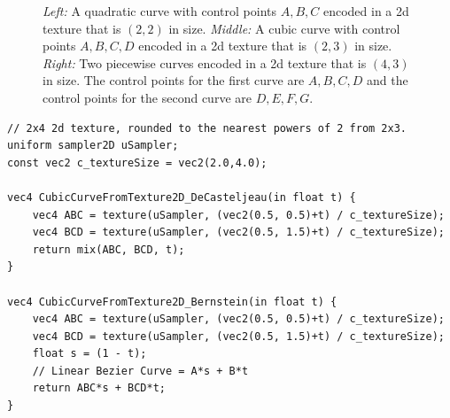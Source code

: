 \documentclass{jcgt}
\begin{document}
  \begin{figure}
    \hspace{5mm}  
    \hspace{5mm}
    \caption{\textit{Left:} A quadratic curve with control points $A,B,C$ encoded in a 2d texture that is $(2,2)$ in size. \textit{Middle:} A cubic curve with control points $A,B,C,D$ encoded in a 2d texture that is $(2,3)$ in size.  \textit{Right:} Two piecewise curves encoded in a 2d texture that is $(4,3)$ in size.  The control points for the first curve are $A,B,C,D$ and the control points for the second curve are $D,E,F,G$.} 
    \label{fig:texlayeout2d}
  \end{figure}  

\begin{lstlisting}[caption={GLSL for evaluating a cubic curve encoded in a $(2,4)$ pixel 2d texture.  Bilinear texture sampling used to evaluate the first two levels of the De Casteljeau algorithm, then the process is continued both with the De Casteljeau algorithm, as well as the Bernstein form of a linear Bezier curve (lerp).}, label={lst:GLSLCubicTexture2D}]
// 2x4 2d texture, rounded to the nearest powers of 2 from 2x3.
uniform sampler2D uSampler; 
const vec2 c_textureSize = vec2(2.0,4.0);

vec4 CubicCurveFromTexture2D_DeCasteljeau(in float t) {
    vec4 ABC = texture(uSampler, (vec2(0.5, 0.5)+t) / c_textureSize);
    vec4 BCD = texture(uSampler, (vec2(0.5, 1.5)+t) / c_textureSize);
    return mix(ABC, BCD, t);
}

vec4 CubicCurveFromTexture2D_Bernstein(in float t) {
    vec4 ABC = texture(uSampler, (vec2(0.5, 0.5)+t) / c_textureSize);
    vec4 BCD = texture(uSampler, (vec2(0.5, 1.5)+t) / c_textureSize);
    float s = (1 - t);
    // Linear Bezier Curve = A*s + B*t
    return ABC*s + BCD*t;
}
\end{lstlisting}
\end{document}
